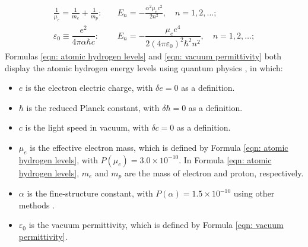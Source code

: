 \documentclass[twoside]{article}
\numberwithin{equation}{section}
\begin{document}
\begin{align}
\label{eqn: atomic hydrogen levels}
\frac{1}{\mu_e} = \frac{1}{m_e} + \frac{1}{m_p}:&\quad  
	E_n = -\frac{\alpha^2 \mu_e c^2}{2n^2}, \quad n=1,2,\dots; \\
\label{eqn: vacuum permittivity}
\varepsilon_0 \equiv \dfrac{e^2}{4 \pi \alpha \hbar c}:&\quad 
E_n =-\dfrac{\mu_e e^4}{2(4\pi\varepsilon_0)^2\hbar^2 n^2}, \quad n=1,2,\dots;
\end{align}
Formulas \eqref{eqn: atomic hydrogen levels} and \eqref{eqn: vacuum permittivity} both display the atomic hydrogen energy levels using quantum physics \cite{Fundamentals_of_Physics}, in which:
\begin{itemize}
\item $e$ is the electron electric charge, with $\delta e = 0$ as a definition.
\item $\hbar$ is the reduced Planck constant, with $\delta \hbar = 0$ as a definition.
\item $c$ is the light speed in vacuum, with $\delta c = 0$ as a definition.
\item $\mu_e$ is the effective electron mass, which is defined by Formula \eqref{eqn: atomic hydrogen levels}, with $P(\mu_e) = 3.0\times 10^{-10}$. In Formula \eqref{eqn: atomic hydrogen levels}, $m_e$ and $m_p$ are the mass of electron and proton, respectively.
\item $\alpha$ is the fine-structure constant, with $P(\alpha) = 1.5\times 10^{-10}$ using other methods \cite{CODATA_2018, Fine_Structure_Constant}.
\item $\varepsilon_0$ is the vacuum permittivity, which is defined by Formula \eqref{eqn: vacuum permittivity}.
\end{itemize}
\end{document}
